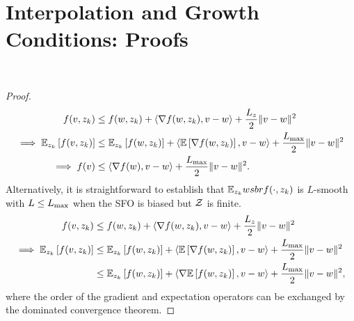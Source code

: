 
\section{Interpolation and Growth Conditions: Proofs}~\label{app:interpolation-gc}

\indSmoothToSmooth*
\begin{proof}
\begin{align*}
    f(v, z_{k}) &\leq f(w, z_{k}) + \left\langle\nabla f(w, z_{k}), v - w\right\rangle + \frac{L_z}{2} \|v - w\|^2\\
    \implies \mathbb{E}_{z_{k}} \left[f(v, z_{k})\right] &\leq \mathbb{E}_{z_{k}} \left[f(w, z_{k})\right] + \left\langle\mathbb{E}\left[\nabla f(w, z_{k})\right], v - w\right\rangle + \frac{L_{\text{max}}}{2} \|v - w\|^2\\
    \implies f(v) &\leq \left\langle\nabla f(w), v - w\right\rangle + \frac{L_{\text{max}}}{2}\|v - w\|^2. 
\end{align*}
Alternatively, it is straightforward to establish that \( \mathbb{E}_{z_{k}} wsbr{f(\cdot, z_{k})} \) is \( L \)-smooth with \( L \leq L_{\text{max}} \) when the SFO is biased but \( \mathcal{Z} \) is finite.
\begin{align*}
    f(v, z_{k}) &\leq f(w, z_{k}) + \left\langle\nabla f(w, z_{k}), v - w\right\rangle + \frac{L_z}{2} \|v - w\|^2\\
    \implies \mathbb{E}_{z_{k}} \left[f(v, z_{k})\right] &\leq \mathbb{E}_{z_{k}} \left[f(w, z_{k})\right] + \left\langle\mathbb{E}\left[\nabla f(w, z_{k})\right], v - w\right\rangle + \frac{L_{\text{max}}}{2} \|v - w\|^2\\
                                 &\leq \mathbb{E}_{z_{k}} \left[f(w, z_{k})\right] + \left\langle\nabla \mathbb{E}\left[f(w, z_{k})\right], v - w\right\rangle + \frac{L_{\text{max}}}{2} \|v - w\|^2,
\end{align*}
where the order of the gradient and expectation operators can be exchanged by the dominated convergence theorem.
\end{proof}

